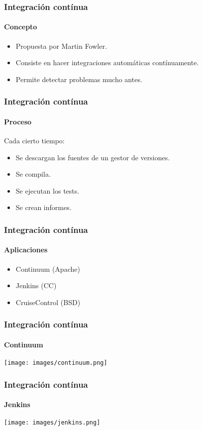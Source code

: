   \begin{frame}
   \frametitle{Integración contínua}
   \framesubtitle{Concepto}

   \begin{itemize}
    \item<+-> Propuesta por Martin Fowler.
    \item<+-> Consiste en hacer integraciones automáticas contínuamente.
    \item<+-> Permite detectar problemas mucho antes.
   \end{itemize}
  \end{frame}


  \begin{frame}
   \frametitle{Integración contínua}
   \framesubtitle{Proceso}

   Cada cierto tiempo:

   \begin{itemize}
    \item<+-> Se descargan los fuentes de un gestor de versiones.
    \item<+-> Se compila.
    \item<+-> Se ejecutan los tests.
    \item<+-> Se crean informes.
   \end{itemize}
  \end{frame}

  \begin{frame}
   \frametitle{Integración contínua}
   \framesubtitle{Aplicaciones}

   \begin{itemize}
    \item Continuum (Apache)
    \item Jenkins (CC)
    \item CruiseControl (BSD)
   \end{itemize}
  \end{frame}


  \begin{frame}
   \frametitle{Integración contínua}
   \framesubtitle{Continuum}

   \begin{center}
    \texttt{[image: images/continuum.png]}
   \end{center}
  \end{frame}

  \begin{frame}
   \frametitle{Integración contínua}
   \framesubtitle{Jenkins}

   \begin{center}
    \texttt{[image: images/jenkins.png]}
   \end{center}
  \end{frame}

